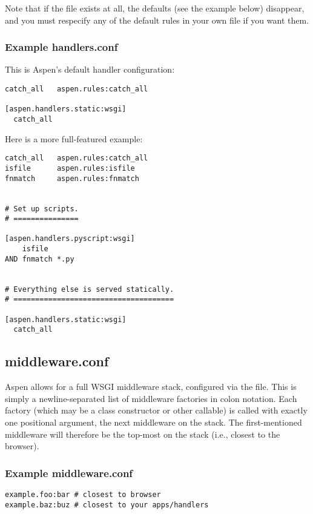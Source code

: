 Note that if the file  exists at all, the defaults
(see the example below) disappear, and you must respecify any of the default
rules in your own file if you want them.


\subsubsection{Example handlers.conf}
This is Aspen's default handler configuration:

\begin{verbatim}
catch_all   aspen.rules:catch_all

[aspen.handlers.static:wsgi]
  catch_all
\end{verbatim}


Here is a more full-featured example:

\begin{verbatim}
catch_all   aspen.rules:catch_all
isfile      aspen.rules:isfile
fnmatch     aspen.rules:fnmatch


# Set up scripts.
# ===============

[aspen.handlers.pyscript:wsgi]
    isfile
AND fnmatch *.py


# Everything else is served statically.
# =====================================

[aspen.handlers.static:wsgi]
  catch_all
\end{verbatim}

\subsection{middleware.conf}
\label{middleware-conf}

Aspen allows for a full WSGI middleware stack, configured via the
 file. This is simply a newline-separated list of
middleware factories in colon notation. Each factory (which may be a class
constructor or other callable) is called with exactly one positional argument,
the next middleware on the stack. The first-mentioned middleware will therefore
be the top-most on the stack (i.e., closest to the browser).


\subsubsection{Example middleware.conf}

\begin{verbatim}
example.foo:bar # closest to browser
example.baz:buz # closest to your apps/handlers
\end{verbatim}


